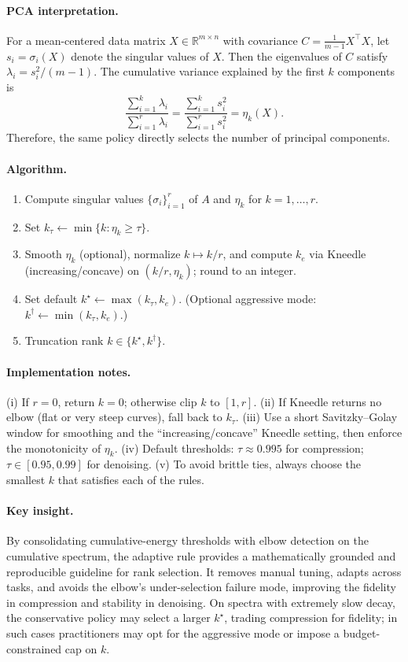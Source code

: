 \documentclass[11pt,a4paper]{article}
\begin{document}
\paragraph{PCA interpretation.}
For a mean-centered data matrix \(X\in\mathbb{R}^{m\times n}\) with covariance \(C=\tfrac{1}{m-1}X^\top X\), let \(s_i=\sigma_i(X)\) denote the singular values of \(X\). 
Then the eigenvalues of \(C\) satisfy \(\lambda_i=s_i^2/(m-1)\). 
The cumulative variance explained by the first \(k\) components is
\[
\frac{\sum_{i=1}^{k}\lambda_i}{\sum_{i=1}^{r}\lambda_i}
= \frac{\sum_{i=1}^{k}s_i^2}{\sum_{i=1}^{r}s_i^2}
= \eta_k(X).
\]
Therefore, the same policy directly selects the number of principal components.

\paragraph{Algorithm.}
\begin{enumerate}[noitemsep, topsep=0pt]
    \item Compute singular values \(\{\sigma_i\}_{i=1}^{r}\) of \(A\) and \(\eta_k\) for \(k=1,\dots,r\).
    \item Set \(k_\tau \gets \min\{k:\eta_k\ge\tau\}\).
    \item Smooth \(\eta_k\) (optional), normalize \(k\mapsto k/r\), and compute \(k_e\) via Kneedle (increasing/concave) on \((k/r,\eta_k)\); round to an integer.
    \item Set default \(k^\star \gets \max(k_\tau,k_e)\). (Optional aggressive mode: \(k^\dagger \gets \min(k_\tau,k_e)\).)
    \item[\textbf{Output:}] Truncation rank \(k \in \{k^\star, k^\dagger\}\).
\end{enumerate}

\paragraph{Implementation notes.}
(i) If \(r=0\), return \(k=0\); otherwise clip \(k\) to \([1,r]\).  
(ii) If Kneedle returns no elbow (flat or very steep curves), fall back to \(k_\tau\).  
(iii) Use a short Savitzky--Golay window for smoothing and the ``increasing/concave'' Kneedle setting, then enforce the monotonicity of \(\eta_k\).  
(iv) Default thresholds: \(\tau\approx0.995\) for compression; \(\tau\in[0.95,0.99]\) for denoising.  
(v) To avoid brittle ties, always choose the smallest \(k\) that satisfies each of the rules.

\paragraph{Key insight.}
By consolidating cumulative-energy thresholds with elbow detection on the cumulative spectrum, the adaptive rule provides a mathematically grounded and reproducible guideline for rank selection. 
It removes manual tuning, adapts across tasks, and avoids the elbow’s under-selection failure mode, improving the fidelity in compression and stability in denoising. 
On spectra with extremely slow decay, the conservative policy may select a larger \(k^\star\), trading compression for fidelity; in such cases practitioners may opt for the aggressive mode or impose a budget-constrained cap on \(k\).
\end{document}
